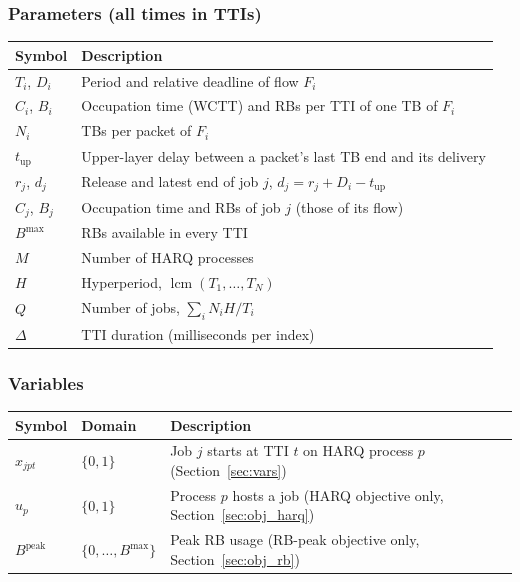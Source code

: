 \subsubsection*{Parameters (all times in TTIs)}
\begin{center}
\begin{tabular}{ll}
\toprule
\textbf{Symbol} & \textbf{Description} \\
\midrule
$T_i$, $D_i$ & Period and relative deadline of flow $F_i$ \\
$C_i$, $B_i$ & Occupation time (WCTT) and RBs per TTI of one TB of $F_i$ \\
$N_i$ & TBs per packet of $F_i$ \\
$t_\mathrm{up}$ & Upper-layer delay between a packet's last TB end and its delivery \\
$r_j$, $d_j$ & Release and latest end of job $j$, $d_j = r_j + D_i - t_\mathrm{up}$ \\
$C_j$, $B_j$ & Occupation time and RBs of job $j$ (those of its flow) \\
$B^{\max}$ & RBs available in every TTI \\
$M$ & Number of HARQ processes \\
$H$ & Hyperperiod, $\operatorname{lcm}(T_1, \dots, T_N)$ \\
$Q$ & Number of jobs, $\sum_i N_i H / T_i$ \\
$\Delta$ & TTI duration (milliseconds per index) \\
\bottomrule
\end{tabular}
\end{center}

\subsubsection*{Variables}
\begin{center}
\begin{tabular}{lll}
\toprule
\textbf{Symbol} & \textbf{Domain} & \textbf{Description} \\
\midrule
$x_{jpt}$ & $\{0,1\}$ & Job $j$ starts at TTI $t$ on HARQ process $p$ (Section~\ref{sec:vars}) \\
$u_p$ & $\{0,1\}$ & Process $p$ hosts a job (HARQ objective only, Section~\ref{sec:obj_harq}) \\
$B^{\mathrm{peak}}$ & $\{0, \dots, B^{\max}\}$ & Peak RB usage (RB-peak objective only, Section~\ref{sec:obj_rb}) \\
\bottomrule
\end{tabular}
\end{center}


